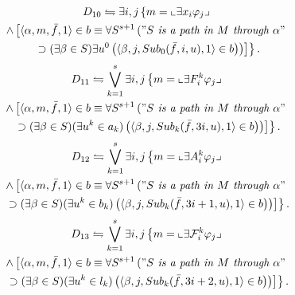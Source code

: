 \documentclass{asl}
\theoremstyle{definition}
\begin{document}
\begin{multline*}
D_{10}\leftrightharpoons \exists i,j\left\lbrace m=\llcorner\exists x_i \varphi_j\lrcorner 
\right.
\\
\left.
\wedge \left[\langle\alpha, m,\bar{f},1\rangle \in b \equiv 
\forall S^{s+1}\left("S\textit{ is a path in }M\textit{ through }\alpha" 
\right.
\right.
\right.
\\
\left.
\left.
\left.
\supset(\exists\beta\in S)\exists u^0\left(\langle \beta,j,Sub_0(\bar{f},i,u),1\rangle \in b \right)
\right) 
\right]\right\rbrace. 
\end{multline*}
\begin{multline*}
D_{11}\leftrightharpoons \bigvee_{k=1}^s\exists i,j\left\lbrace m=\llcorner\exists F_i^k \varphi_j\lrcorner 
\right.
\\
\left.
\wedge \left[\langle\alpha, m,\bar{f},1\rangle \in b \equiv 
\forall S^{s+1}\left("S\textit{ is a path in }M\textit{ through }\alpha" 
\right.
\right.
\right.
\\
\left.
\left.
\left.
\supset(\exists\beta\in S)(\exists u^k\in a_k)\left(\langle \beta,j,Sub_k(\bar{f},3i,u),1\rangle \in b \right)
\right) 
\right]\right\rbrace. 
\end{multline*}
\begin{multline*}
D_{12}\leftrightharpoons \bigvee_{k=1}^s\exists i,j\left\lbrace m=\llcorner\exists A_i^k \varphi_j\lrcorner 
\right.
\\
\left.
\wedge \left[\langle\alpha, m,\bar{f},1\rangle \in b \equiv 
\forall S^{s+1}\left("S\textit{ is a path in }M\textit{ through }\alpha" 
\right.
\right.
\right.
\\
\left.
\left.
\left.
\supset(\exists\beta\in S)(\exists u^k\in b_k)\left(\langle \beta,j,Sub_k(\bar{f},3i+1,u),1\rangle \in b \right)
\right) 
\right]\right\rbrace. 
\end{multline*}\begin{multline*}
D_{13}\leftrightharpoons \bigvee_{k=1}^s\exists i,j\left\lbrace m=\llcorner\exists \mathcal{F}_i^k \varphi_j\lrcorner 
\right.
\\
\left.
\wedge \left[\langle\alpha, m,\bar{f},1\rangle \in b \equiv 
\forall S^{s+1}\left("S\textit{ is a path in }M\textit{ through }\alpha" 
\right.
\right.
\right.
\\
\left.
\left.
\left.
\supset(\exists\beta\in S)(\exists u^k\in l_k)\left(\langle\beta,j,Sub_k(\bar{f},3i+2,u),1\rangle \in b \right)
\right) 
\right]\right\rbrace. 
\end{multline*}
\end{document}
